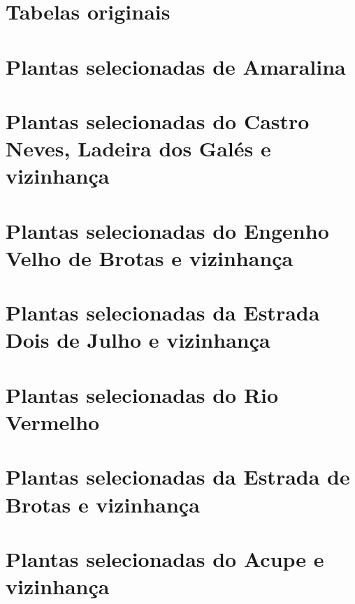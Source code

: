 \begin{anexosenv}

\partanexos

\chapter{Tabelas originais}






\chapter{Plantas selecionadas de Amaralina}




\chapter{Plantas selecionadas do Castro Neves, Ladeira dos Galés e vizinhança}





\chapter{Plantas selecionadas do Engenho Velho de Brotas e vizinhança}




\chapter{Plantas selecionadas da Estrada Dois de Julho e vizinhança}



\chapter{Plantas selecionadas do Rio Vermelho}



\chapter{Plantas selecionadas da Estrada de Brotas e vizinhança}



\chapter{Plantas selecionadas do Acupe e vizinhança}





\end{anexosenv}
